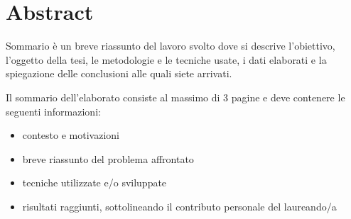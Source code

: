 \chapter*{Abstract}
\label{abstract}


Sommario è un breve riassunto del lavoro svolto dove si descrive l'obiettivo, l'oggetto della tesi, le
metodologie e le tecniche usate, i dati elaborati e la spiegazione delle conclusioni alle quali siete arrivati.

Il sommario dell’elaborato consiste al massimo di 3 pagine e deve contenere le seguenti informazioni:
\begin{itemize}
  \item contesto e motivazioni
  \item breve riassunto del problema affrontato
  \item tecniche utilizzate e/o sviluppate
  \item risultati raggiunti, sottolineando il contributo personale del laureando/a
\end{itemize}

\clearpage



